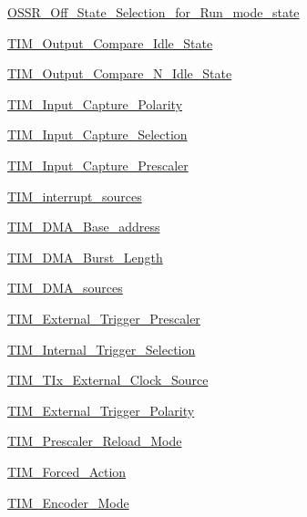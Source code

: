 \begin{DoxyCompactItemize}
\item 
\hyperlink{group___o_s_s_r___off___state___selection__for___run__mode__state}{O\+S\+S\+R\+\_\+\+Off\+\_\+\+State\+\_\+\+Selection\+\_\+for\+\_\+\+Run\+\_\+mode\+\_\+state}
\item 
\hyperlink{group___t_i_m___output___compare___idle___state}{T\+I\+M\+\_\+\+Output\+\_\+\+Compare\+\_\+\+Idle\+\_\+\+State}
\item 
\hyperlink{group___t_i_m___output___compare___n___idle___state}{T\+I\+M\+\_\+\+Output\+\_\+\+Compare\+\_\+\+N\+\_\+\+Idle\+\_\+\+State}
\item 
\hyperlink{group___t_i_m___input___capture___polarity}{T\+I\+M\+\_\+\+Input\+\_\+\+Capture\+\_\+\+Polarity}
\item 
\hyperlink{group___t_i_m___input___capture___selection}{T\+I\+M\+\_\+\+Input\+\_\+\+Capture\+\_\+\+Selection}
\item 
\hyperlink{group___t_i_m___input___capture___prescaler}{T\+I\+M\+\_\+\+Input\+\_\+\+Capture\+\_\+\+Prescaler}
\item 
\hyperlink{group___t_i_m__interrupt__sources}{T\+I\+M\+\_\+interrupt\+\_\+sources}
\item 
\hyperlink{group___t_i_m___d_m_a___base__address}{T\+I\+M\+\_\+\+D\+M\+A\+\_\+\+Base\+\_\+address}
\item 
\hyperlink{group___t_i_m___d_m_a___burst___length}{T\+I\+M\+\_\+\+D\+M\+A\+\_\+\+Burst\+\_\+\+Length}
\item 
\hyperlink{group___t_i_m___d_m_a__sources}{T\+I\+M\+\_\+\+D\+M\+A\+\_\+sources}
\item 
\hyperlink{group___t_i_m___external___trigger___prescaler}{T\+I\+M\+\_\+\+External\+\_\+\+Trigger\+\_\+\+Prescaler}
\item 
\hyperlink{group___t_i_m___internal___trigger___selection}{T\+I\+M\+\_\+\+Internal\+\_\+\+Trigger\+\_\+\+Selection}
\item 
\hyperlink{group___t_i_m___t_ix___external___clock___source}{T\+I\+M\+\_\+\+T\+Ix\+\_\+\+External\+\_\+\+Clock\+\_\+\+Source}
\item 
\hyperlink{group___t_i_m___external___trigger___polarity}{T\+I\+M\+\_\+\+External\+\_\+\+Trigger\+\_\+\+Polarity}
\item 
\hyperlink{group___t_i_m___prescaler___reload___mode}{T\+I\+M\+\_\+\+Prescaler\+\_\+\+Reload\+\_\+\+Mode}
\item 
\hyperlink{group___t_i_m___forced___action}{T\+I\+M\+\_\+\+Forced\+\_\+\+Action}
\item 
\hyperlink{group___t_i_m___encoder___mode}{T\+I\+M\+\_\+\+Encoder\+\_\+\+Mode}

\end{DoxyCompactItemize}
